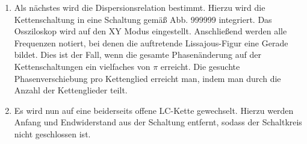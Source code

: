 \begin{enumerate}
\item Als nächstes wird die Dispersionsrelation bestimmt. Hierzu wird die
 Kettenschaltung in eine Schaltung gemäß Abb. 999999 integriert. Das Ossziloskop
  wird auf den XY Modus eingestellt. Anschließend werden alle Frequenzen notiert,
    bei denen die auftretende Lissajous-Figur eine Gerade bildet. Dies ist der
     Fall, wenn die gesamte Phasenänderung auf der Kettenschaltungen ein
      vielfaches von $\pi$ erreicht. Die gesuchte Phasenverschiebung pro Kettenglied
        erreicht man, indem man durch die Anzahl der Kettenglieder teilt.

\item Es wird nun auf eine beiderseits offene LC-Kette gewechselt. Hierzu werden
 Anfang und Endwiderstand aus der Schaltung entfernt, sodass der Schaltkreis
  nicht geschlossen ist. 


\end{enumerate}
